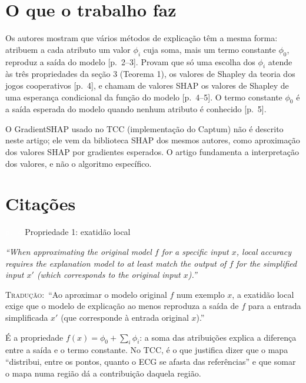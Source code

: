 \documentclass[11pt,a4paper]{article}
\newcommand{\pagechip}[1]{{\setlength{\fboxsep}{1.5pt}\colorbox{cAcc}{\textcolor{white}{\scriptsize\texttt{#1}}}}}
\newenvironment{origquote}{\par\itshape\small}{\par}
\newenvironment{tradquote}{\par\small\textsc{Tradução:}\ }{\par}
\newcommand{\explab}[1]{\par\smallskip{\small\color{cAcc}\textbf{\MakeUppercase{#1}}}\par}
\begin{document}
\section{O que o trabalho faz}
Os autores mostram que vários métodos de explicação têm a mesma forma: atribuem a cada atributo um valor $\phi_i$ cuja soma, mais um termo constante $\phi_0$, reproduz a saída do modelo [p.~2--3]. Provam que só uma escolha dos $\phi_i$ atende às três propriedades da seção 3 (Teorema 1), os valores de Shapley da teoria dos jogos cooperativos [p.~4], e chamam de valores SHAP os valores de Shapley de uma esperança condicional da função do modelo [p.~4--5]. O termo constante $\phi_0$ é a saída esperada do modelo quando nenhum atributo é conhecido [p.~5].

O GradientSHAP usado no TCC (implementação do Captum) não é descrito neste artigo; ele vem da biblioteca SHAP dos mesmos autores, como aproximação dos valores SHAP por gradientes esperados. O artigo fundamenta a interpretação dos valores, e não o algoritmo específico.

\section{Citações}

\begin{citacard}{\pagechip{p. 4} Propriedade 1: exatidão local}
\begin{origquote}“When approximating the original model $f$ for a specific input $x$, local accuracy requires the explanation model to at least match the output of $f$ for the simplified input $x'$ (which corresponds to the original input $x$).”\end{origquote}
\begin{tradquote}“Ao aproximar o modelo original $f$ num exemplo $x$, a exatidão local exige que o modelo de explicação ao menos reproduza a saída de $f$ para a entrada simplificada $x'$ (que corresponde à entrada original $x$).”\end{tradquote}
\explab{Explicação}
É a propriedade $f(x) = \phi_0 + \sum_i \phi_i$: a soma das atribuições explica a diferença entre a saída e o termo constante. No TCC, é o que justifica dizer que o mapa ``distribui, entre os pontos, quanto o ECG se afasta das referências'' e que somar o mapa numa região dá a contribuição daquela região.
\end{citacard}
\end{document}
